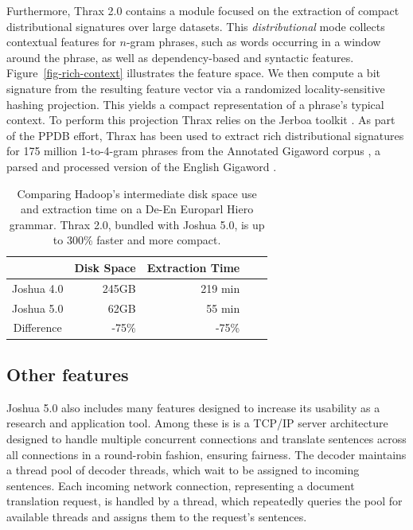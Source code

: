 \documentclass[11pt]{article}
\begin{document}
Furthermore, Thrax 2.0 contains a module focused on the extraction of
compact distributional signatures over large datasets. This
\emph{distributional} mode collects contextual features for $n$-gram
phrases, such as words occurring in a window around the phrase, as
well as dependency-based and syntactic
features. Figure~\ref{fig-rich-context} illustrates the feature
space. We then compute a bit signature from the resulting feature
vector via a randomized locality-sensitive hashing projection.  This
yields a compact representation of a phrase's typical context. To
perform this projection Thrax relies on the Jerboa toolkit
\cite{Jerboa}. As part of the PPDB effort, Thrax has been used to
extract rich distributional signatures for 175 million 1-to-4-gram
phrases from the Annotated Gigaword corpus \cite{annotated-gigaword},
a parsed and processed version of the English Gigaword
\cite{Gigaword}.

\begin{table}[t]
  \begin{center}
    \begin{tabular}{|c|r|r|r|r|}
      \hline
      & Disk Space & Extraction Time \\
      \hline
      \hline
      Joshua 4.0 & 245GB & 219 min \\
      \hline
      Joshua 5.0 & 62GB  & 55 min\\
      \hline
      \hline
      Difference & -75\% & -75\% \\
      \hline
    \end{tabular}
  \end{center}
  \caption{Comparing Hadoop's intermediate disk space use and extraction time on a
    De-En Europarl Hiero grammar. Thrax 2.0, bundled with Joshua 5.0,
    is up to 300\% faster and more compact.}
  \label{tab-thrax-speed}
\end{table}

\subsection{Other features}
\label{sec:other}

Joshua 5.0 also includes many features designed to increase its
usability as a research and application tool. Among these is is a
TCP/IP server architecture designed to handle multiple concurrent
connections and translate sentences across all connections in a
round-robin fashion, ensuring fairness.  The decoder maintains a
thread pool of decoder threads, which wait to be assigned to incoming
sentences. Each incoming network connection, representing a document
translation request, is handled by a thread, which repeatedly queries
the pool for available threads and assigns them to the request's
sentences.
\end{document}
